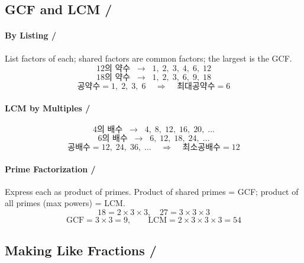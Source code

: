 
\subsection*{GCF and LCM / }

\paragraph{By Listing / }

List factors of each; shared factors are common factors; the largest is the GCF.
\[
12 \text{의 약수} \;\; \rightarrow \;\; 1, \; 2, \; 3, \; 4, \; 6, \; 12
\]
\[
18 \text{의 약수} \;\; \rightarrow \;\; 1, \; 2, \; 3, \; 6, \; 9, \; 18
\]
\[
\text{공약수} = 1, \; 2, \; 3, \; 6 
\;\;\;\; \Rightarrow \;\;\;\; 
\text{최대공약수} = 6
\]


\paragraph{LCM by Multiples / }
\[
4 \text{의 배수} \;\; \rightarrow \;\; 4, \; 8, \; 12, \; 16, \; 20, \; \ldots
\]
\[
6 \text{의 배수} \;\; \rightarrow \;\; 6, \; 12, \; 18, \; 24, \; \ldots
\]
\[
\text{공배수} = 12, \; 24, \; 36, \; \ldots 
\;\;\;\; \Rightarrow \;\;\;\; 
\text{최소공배수} = 12
\]

\paragraph{Prime Factorization / }

Express each as product of primes. Product of shared primes = GCF; product of all primes (max powers) = LCM.
\[
18=2\times3\times3,\quad 27=3\times3\times3
\]
\[
\mathrm{GCF}=3\times3=9,\qquad
\mathrm{LCM}=2\times3\times3\times3=54
\]


\subsection*{Making Like Fractions / }


